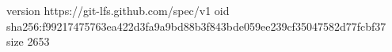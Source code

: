 version https://git-lfs.github.com/spec/v1
oid sha256:f99217475763ea422d3fa9a9bd88b3f843bde059ee239cf35047582d77fcbf37
size 2653
